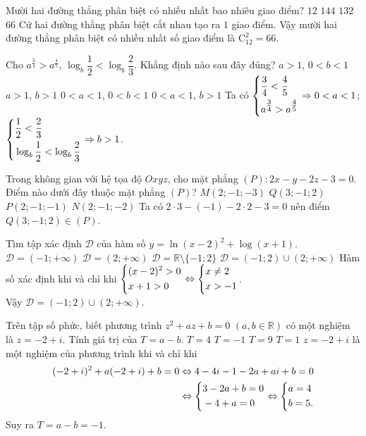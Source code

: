\begin{ex}%
	Mười hai đường thẳng phân biệt có nhiều nhất bao nhiêu giao điểm?
	\choice
	{$12$}
	{$144$}
	{$132$}
	{\True $66$}
	\loigiai
	{Cứ hai đường thẳng phân biệt cắt nhau tạo ra $1$ giao điểm. Vậy mười hai đường thẳng phân biệt có nhiều nhất số giao điểm là $\mathrm{C}^2_{12}=66$.
	}
\end{ex}
\begin{ex}%
	Cho $a^{\tfrac{3}{4}}>a^{\tfrac{4}{5}}$, $\log_b\dfrac{1}{2}<\log_b\dfrac{2}{3}$. Khẳng định nào sau đây đúng?
	\choice
	{$a>1$, $0<b<1$}
	{$a>1$, $b>1$}
	{$0<a<1$, $0<b<1$}
	{\True $0<a<1$, $b>1$}
	\loigiai
	{Ta có $\left\{\begin{aligned}&\dfrac{3}{4}<\dfrac{4}{5}\\&a^{\tfrac{3}{4}}>a^{\tfrac{4}{5}}\end{aligned}\right.\Rightarrow 0<a<1$; 
		$\left\{\begin{aligned}&\dfrac{1}{2}<\dfrac{2}{3}\\&\log_b\dfrac{1}{2}<\log_b\dfrac{2}{3}\end{aligned}\right.\Rightarrow b>1$.
	}
\end{ex}
\begin{ex}%
	Trong không gian với hệ tọa độ $Oxyz$, cho mặt phẳng $(P)\colon 2x-y-2z-3=0$. Điểm nào dưới đây thuộc mặt phẳng $(P)$?
	\choice
	{$M(2; -1; -3)$}
	{\True $Q(3; -1; 2)$}
	{$P(2; -1; -1)$}
	{$N(2; -1; -2)$}
	\loigiai
	{Ta có $2\cdot 3-(-1)-2\cdot 2-3=0$ nên điểm $Q(3; -1; 2)\in (P)$.
	}
\end{ex}

\begin{ex}%
	Tìm tập xác định $\mathscr{D}$ của hàm số $y=\ln(x-2)^2+\log(x+1)$.
	\choice
	{$\mathscr{D}=(-1; +\infty)$}
	{$\mathscr{D}=(2; +\infty)$}
	{$\mathscr{D}=\mathbb{R}\setminus\{-1; 2\}$}
	{\True $\mathscr{D}=(-1; 2)\cup (2; +\infty)$}
	\loigiai
	{Hàm số xác định khi và chỉ khi $\left\{\begin{aligned}&(x-2)^2>0\\&x+1>0\end{aligned}\right.\Leftrightarrow\left\{\begin{aligned}&x\neq 2\\&x>-1\end{aligned}\right.$.\\
		 Vậy $\mathscr{D}=(-1; 2)\cup (2; +\infty)$.
	}
\end{ex}

\begin{ex}%
	Trên tập số phức, biết phương trình $z^2+az+b=0$ $(a, b\in\mathbb{R})$ có một nghiệm là $z=-2+i$. Tính giá trị của $T=a-b$.
	\choice
	{$T=4$}
	{\True $T=-1$}
	{$T=9$}
	{$T=1$}
	\loigiai
	{
		$z=-2+i$ là một nghiệm của phương trình khi và chỉ khi
		\begin{eqnarray*}
			(-2+i)^2+a(-2+i)+b=0&\Leftrightarrow 4-4i-1-2a+ai+b=0\\
			&\Leftrightarrow\left\{\begin{aligned}&3-2a+b=0\\&-4+a=0\end{aligned}\right.\Leftrightarrow\left\{\begin{aligned}&a=4\\&b=5.\end{aligned}\right.
		\end{eqnarray*}
		Suy ra $T=a-b=-1$.
	}
\end{ex}

